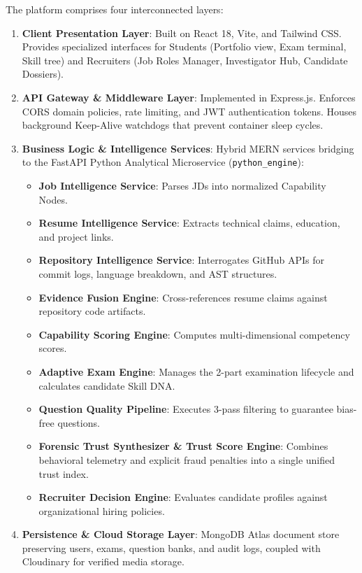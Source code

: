 The platform comprises four interconnected layers:
\begin{enumerate}
    \item \textbf{Client Presentation Layer}: Built on React 18, Vite, and Tailwind CSS. Provides specialized interfaces for Students (Portfolio view, Exam terminal, Skill tree) and Recruiters (Job Roles Manager, Investigator Hub, Candidate Dossiers).
    \item \textbf{API Gateway \& Middleware Layer}: Implemented in Express.js. Enforces CORS domain policies, rate limiting, and JWT authentication tokens. Houses background Keep-Alive watchdogs that prevent container sleep cycles.
    \item \textbf{Business Logic \& Intelligence Services}: Hybrid MERN services bridging to the FastAPI Python Analytical Microservice (\texttt{python\_engine}):
    \begin{itemize}
        \item \textbf{Job Intelligence Service}: Parses JDs into normalized Capability Nodes.
        \item \textbf{Resume Intelligence Service}: Extracts technical claims, education, and project links.
        \item \textbf{Repository Intelligence Service}: Interrogates GitHub APIs for commit logs, language breakdown, and AST structures.
        \item \textbf{Evidence Fusion Engine}: Cross-references resume claims against repository code artifacts.
        \item \textbf{Capability Scoring Engine}: Computes multi-dimensional competency scores.
        \item \textbf{Adaptive Exam Engine}: Manages the 2-part examination lifecycle and calculates candidate Skill DNA.
        \item \textbf{Question Quality Pipeline}: Executes 3-pass filtering to guarantee bias-free questions.
        \item \textbf{Forensic Trust Synthesizer \& Trust Score Engine}: Combines behavioral telemetry and explicit fraud penalties into a single unified trust index.
        \item \textbf{Recruiter Decision Engine}: Evaluates candidate profiles against organizational hiring policies.
    \end{itemize}
    \item \textbf{Persistence \& Cloud Storage Layer}: MongoDB Atlas document store preserving users, exams, question banks, and audit logs, coupled with Cloudinary for verified media storage.
\end{enumerate}

